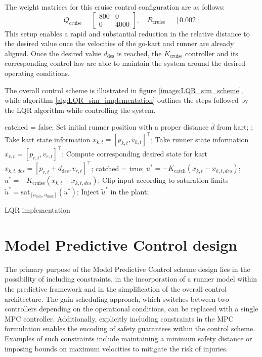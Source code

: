 \documentclass[a4paper,12pt,oneside]{book}
\begin{document}
The weight matrices for this cruise control configuration are as follows:
\begin{equation}
    Q_{\text{cruise}} =
    \begin{bmatrix}
        800 & 0 \\
        0 & 4000
    \end{bmatrix},
    \quad
    R_{\text{cruise}} = [0.002]
\end{equation}
This setup enables a rapid and substantial reduction in the relative distance to the desired value once the velocities of the go-kart and runner are already aligned.
Once the desired value $d_{\text{des}}$ is reached, the $K_{\text{cruise}}$ controller and its corresponding control law are able to maintain the system around the desired operating conditions.

\bigskip
The overall control scheme is illustrated in figure \ref{image:LQR_sim_scheme}, while algorithm \ref{alg:LQR_sim_implementation} outlines the steps followed by the LQR algorithm while controlling the system.

\begin{algorithm}
\begin{algorithmic}[1]
	\State catched = false;
	\State Set initial runner position with a proper distance $\bar{d}$ from kart;
	;
		\State Take kart state information $x_{k,t} = [p_{k,t}, v_{k,t}]^\top$;
		\State Take runner state information $x_{r,t} = [p_{r,t}, v_{r,t}]^\top$;
		\State Compute corresponding desired state for kart $x_{k,t,des} = [p_{r,t} + d_{\text{des}}, v_{r,t}]^\top$;
			\State catched = true;
		\EndIf
			\State $u^* = - K_{\text{catch}} (x_{k,t} - x_{k,t,des}) $;
		\Else 
			\State $u^* = - K_{\text{cruise}} (x_{k,t} - x_{k,t,des}) $;
		\EndIf
		\State Clip input according to saturation limits $\tilde{u}^* = \text{sat}_{[a_{\min}, a_{\max}]} (u^*)$;
		\State Inject $\tilde{u}^*$ in the plant;
	\EndFor
\caption{LQR implementation}
\label{alg:LQR_sim_implementation}
\end{algorithmic}
\end{algorithm}


\section{Model Predictive Control design}
The primary purpose of the Model Predictive Control scheme design lies in the possibility of including constraints, in the incorporation of a runner model within the predictive framework and in the simplification of the overall control architecture.
The gain scheduling approach, which switches between two controllers depending on the operational conditions, can be replaced with a single MPC controller.
Additionally, explicitly including constraints in the MPC formulation enables the encoding of safety guarantees within the control scheme. 
Examples of such constraints include maintaining a minimum safety distance or imposing bounds on maximum velocities to mitigate the risk of injuries.
\end{document}
